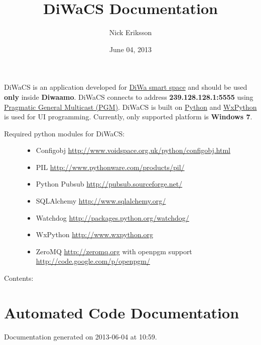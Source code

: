 \documentclass[letterpaper,10pt,english]{sphinxmanual}
\title{DiWaCS Documentation}
\date{June 04, 2013}
\author{Nick Eriksson}
\begin{document}
\maketitle
\tableofcontents
{}\label{index::doc}


DiWaCS is an application developed for \href{https://cse.aalto.fi/research/groups/stratus/research/research-projects/}{DiWa smart space} and should be used \textbf{only} inside \textbf{Diwaamo}. DiWaCS connects to address \textbf{239.128.128.1:5555} using \href{http://code.google.com/p/openpgm/}{Pragmatic General Multicast (PGM)}. DiWaCS is built on \href{http://www.python.org}{Python} and \href{http://www.wxpython.org}{WxPython} is used for UI programming. Currently, only supported platform is \textbf{Windows 7}.
\begin{description}
\item[{Required python modules for DiWaCS:}] \leavevmode\begin{itemize}
\item {} 
Configobj \href{http://www.voidspace.org.uk/python/configobj.html}{http://www.voidspace.org.uk/python/configobj.html}

\item {} 
PIL \href{http://www.pythonware.com/products/pil/}{http://www.pythonware.com/products/pil/}

\item {} 
Python Pubsub \href{http://pubsub.sourceforge.net/}{http://pubsub.sourceforge.net/}

\item {} 
SQLAlchemy \href{http://www.sqlalchemy.org/}{http://www.sqlalchemy.org/}

\item {} 
Watchdog  \href{http://packages.python.org/watchdog/}{http://packages.python.org/watchdog/}

\item {} 
WxPython \href{http://www.wxpython.org}{http://www.wxpython.org}

\item {} 
ZeroMQ \href{http://zeromq.org}{http://zeromq.org} with openpgm support \href{http://code.google.com/p/openpgm/}{http://code.google.com/p/openpgm/}

\end{itemize}

\end{description}

Contents:


\chapter{Automated Code Documentation}
\label{api:automated-code-documentation}\label{api::doc}\label{api:welcome-to-diwacs-documentation}
Documentation generated on 2013-06-04 at 10:59.
\end{document}
